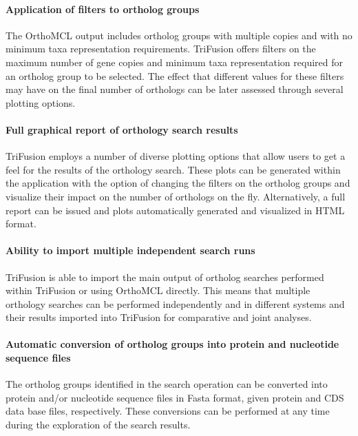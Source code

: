 \documentclass[12pt]{article}
\begin{document}
\paragraph{Application of filters to ortholog groups}

The OrthoMCL output includes ortholog groups with multiple copies and with no minimum taxa representation requirements. TriFusion offers filters on the maximum number of gene copies and minimum taxa representation required for an ortholog group to be selected. The effect that different values for these filters may have on the final number of orthologs can be later assessed through several plotting options.

\paragraph{Full graphical report of orthology search results}

TriFusion employs a number of diverse plotting options that allow users to get a feel for the results of the orthology search. These plots can be generated within the application with the option of changing the filters on the ortholog groups and visualize their impact on the number of orthologs on the fly. Alternatively, a full report can be issued and plots automatically generated and visualized in HTML format.

\paragraph{Ability to import multiple independent search runs}

TriFusion is able to import the main output of ortholog searches performed within TriFusion or using OrthoMCL directly. This means that multiple orthology searches can be performed independently and in different systems and their results imported into TriFusion for comparative and joint analyses.

\paragraph{Automatic conversion of ortholog groups into protein and nucleotide sequence files}

The ortholog groups identified in the search operation can be converted into protein and/or nucleotide sequence files in Fasta format, given protein and CDS data base files, respectively. These conversions can be performed at any time during the exploration of the search results.
\end{document}
